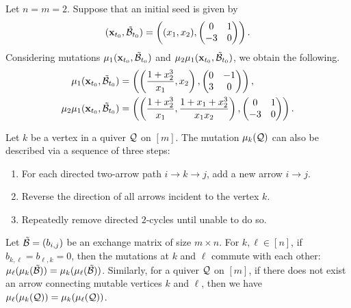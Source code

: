 \begin{example}\label{example_mutation_skewsymmetrizable}
Let $n = m = 2$. Suppose that an initial seed is given by
\[
(\mathbf{x}_{t_0}, \mathcal{\tilde{B}}_{t_0}) = \left(
(x_1,x_2), \begin{pmatrix}
0 & 1 \\ -3 & 0
\end{pmatrix}
\right).
\]
Considering mutations $\mu_1(\mathbf{x}_{t_0}, \mathcal{\tilde{B}}_{t_0})$ and $\mu_2\mu_1(\mathbf{x}_{t_0}, \mathcal{\tilde{B}}_{t_0})$, we obtain the following.
\begin{align*}
\mu_1(\mathbf{x}_{t_0}, \mathcal{\tilde{B}}_{t_0}) &= \left(
\left(
\frac{1+x_2^3}{x_1},x_2
\right), \begin{pmatrix}
0 & -1 \\3 & 0
\end{pmatrix}
\right),\\
\mu_2\mu_1(\mathbf{x}_{t_0}, \mathcal{\tilde{B}}_{t_0}) &= \left(
\left(
\frac{1+x_2^3}{x_1}, \frac{1+x_1+x_2^3}{x_1x_2}
\right),
\begin{pmatrix}
0 & 1  \\ -3 & 0
\end{pmatrix}
\right).
\end{align*}
\end{example}


\begin{remark}\label{rmk_mutation_on_quivers}
Let $k$ be a vertex in a quiver $\mathcal{Q}$ on $[m]$.
The mutation $\mu_k(\mathcal{Q})$ can also be described via a sequence of three steps:
\begin{enumerate}
\item For each directed two-arrow path $i \to k \to j$, add a new arrow $i \to j$.
\item Reverse the direction of all arrows incident to the vertex $k$.
\item Repeatedly remove directed $2$-cycles until unable to do so.
\end{enumerate}
\end{remark}
\begin{remark}\label{rmk_mutation_commutes}
Let $\mathcal{\tilde{B}} = (b_{i,j})$ be an exchange matrix of size $m \times n$.
For $k,\ell \in [n]$, if $b_{k,\ell} = b_{\ell,k} = 0$, then the mutations at $k$ and $\ell$ commute with each other: $\mu_{\ell}(\mu_k(\mathcal{\tilde{B}})) = \mu_k(\mu_{\ell}(\mathcal{\tilde{B}}))$. 
Similarly, for a quiver $\mathcal{Q}$ on $[m]$, if there does not exist an arrow connecting mutable vertices $k$ and $\ell$, then we have $\mu_{\ell}(\mu_k(\mathcal{Q})) = \mu_k(\mu_{\ell}(\mathcal{Q}))$.
\end{remark}


